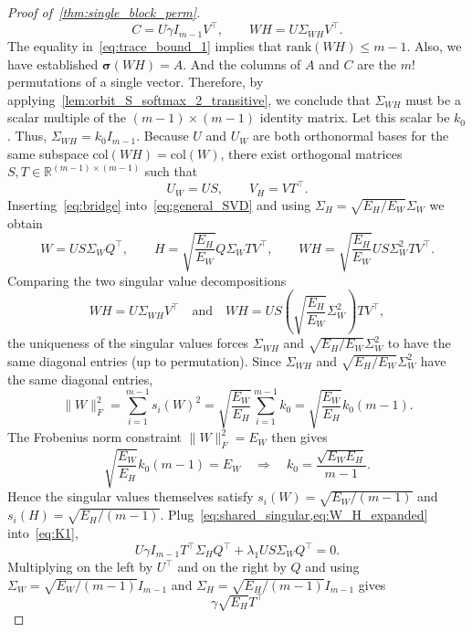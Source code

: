 \documentclass[11pt]{article}
\begin{document}
\begin{proof}[Proof of~\cref{thm:single_block_perm}]
\begin{equation}
  C  = U \gamma I_{m-1} V^{\top},
  \qquad
  WH = U \Sigma_{WH} V^{\top}.
\end{equation}
The equality in~\cref{eq:trace_bound_1} implies that $\mathrm{rank}(WH) \le m-1$. Also, we have established $\boldsymbol{\sigma}(WH) = A$. And the columns of $A$ and $C$ are the $m!$ permutations of a single vector.
Therefore, by applying~\cref{lem:orbit_S_softmax_2_transitive}, we conclude that $\Sigma_{WH}$ must be a scalar multiple of the $(m-1) \times (m-1)$ identity matrix.
Let this scalar be $k_0$. Thus, \( \Sigma_{WH} = k_0 I_{m-1}\). Because \(U\) and \(U_W\) are both orthonormal bases for the same subspace
\(\mathrm{col}(WH)=\mathrm{col}(W)\), there exist orthogonal matrices \(S, T\in\mathbb{R}^{(m-1)\times(m-1)}\) such that
\begin{equation}\label{eq:bridge}
  U_W = U S, \qquad V_H = V T^{\top}.
\end{equation}
Inserting~\cref{eq:bridge} into~\cref{eq:general_SVD} and using \(\Sigma_H=\sqrt{E_H/E_W}\Sigma_W\) we obtain
\begin{equation}\label{eq:W_H_expanded}
  W = U S \Sigma_W Q^{\top},
  \qquad
  H = \sqrt{\frac{E_H}{E_W}} Q \Sigma_W T V^{\top},
  \qquad
  WH = \sqrt{\frac{E_H}{E_W}} U S \Sigma_W^2 T V^{\top}.
\end{equation}
Comparing the two singular value decompositions
\[
  WH = U \Sigma_{WH} V^\top
  \quad\text{and}\quad
  WH = U S \left(\sqrt{\frac{E_H}{E_W}} \Sigma_W^2\right) T V^{\top},
\]
the uniqueness of the singular values forces
\(
\Sigma_{WH} \) and \( \sqrt{E_H/E_W} \Sigma_W^2 \) to have the same diagonal entries (up to permutation). Since \(\Sigma_{WH}\) and \(\sqrt{E_H/E_W} \Sigma_W^2\) have the same diagonal entries, 
\[
  \|W\|_F^2  = \sum_{i=1}^{m-1}s_i(W)^2
                = \sqrt{\frac{E_W}{E_H}}\sum_{i=1}^{m-1}k_0
                = \sqrt{\frac{E_W}{E_H}} k_0 (m-1).
\]
The Frobenius norm constraint \(\|W\|_F^2=E_W\) then gives
\[
  \sqrt{\frac{E_W}{E_H}} k_0 (m-1) = E_W
  \quad\Longrightarrow\quad
  k_0=\frac{\sqrt{E_W E_H}}{m-1}.
\]
Hence the singular values themselves satisfy
\(s_i(W)=\sqrt{E_W / (m-1)}\) and \( s_i(H)=\sqrt{E_H / (m-1)}\).
Plug~\cref{eq:shared_singular,eq:W_H_expanded} into~\cref{eq:K1},
\[
  U \gamma I_{m-1} T^{\top}\Sigma_H Q^{\top}
  + \lambda_1 U S \Sigma_W Q^{\top} = 0.
\]
Multiplying on the left by \(U^{\top}\) and on the right by \(Q\) and using \(\Sigma_W=\sqrt{E_W/(m-1)} I_{m-1}\)  and \(\Sigma_H=\sqrt{E_H/(m-1)} I_{m-1}\) gives
\begin{equation}\label{eq:K1_matrix}
  \gamma\sqrt{E_H} T^{\top}

\end{equation}
\end{proof}
\end{document}
